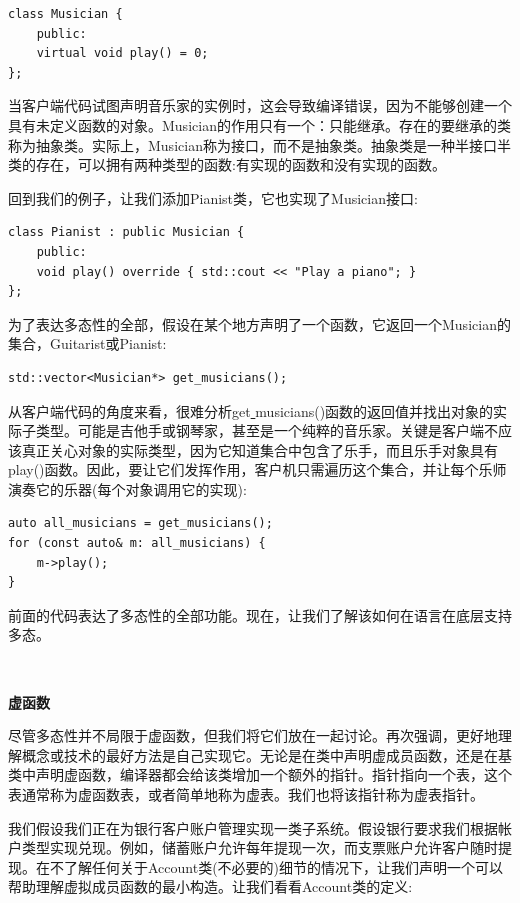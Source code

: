 \begin{lstlisting}[caption={}]
class Musician {
	public:
	virtual void play() = 0;
};
\end{lstlisting}

当客户端代码试图声明音乐家的实例时，这会导致编译错误，因为不能够创建一个具有未定义函数的对象。Musician的作用只有一个：只能继承。存在的要继承的类称为抽象类。实际上，Musician称为接口，而不是抽象类。抽象类是一种半接口半类的存在，可以拥有两种类型的函数:有实现的函数和没有实现的函数。\par
回到我们的例子，让我们添加Pianist类，它也实现了Musician接口:\par

\begin{lstlisting}[caption={}]
class Pianist : public Musician {
	public:
	void play() override { std::cout << "Play a piano"; }
};
\end{lstlisting}

为了表达多态性的全部，假设在某个地方声明了一个函数，它返回一个Musician的集合，Guitarist或Pianist: \par

\begin{lstlisting}[caption={}]
std::vector<Musician*> get_musicians();
\end{lstlisting}

从客户端代码的角度来看，很难分析get\underline{ }musicians()函数的返回值并找出对象的实际子类型。可能是吉他手或钢琴家，甚至是一个纯粹的音乐家。关键是客户端不应该真正关心对象的实际类型，因为它知道集合中包含了乐手，而且乐手对象具有play()函数。因此，要让它们发挥作用，客户机只需遍历这个集合，并让每个乐师演奏它的乐器(每个对象调用它的实现):\par

\begin{lstlisting}[caption={}]
auto all_musicians = get_musicians();
for (const auto& m: all_musicians) {
	m->play();
}
\end{lstlisting}

前面的代码表达了多态性的全部功能。现在，让我们了解该如何在语言在底层支持多态。 \par

\noindent\textbf{}\ \par
\textbf{虚函数} \ \par
尽管多态性并不局限于虚函数，但我们将它们放在一起讨论。再次强调，更好地理解概念或技术的最好方法是自己实现它。无论是在类中声明虚成员函数，还是在基类中声明虚函数，编译器都会给该类增加一个额外的指针。指针指向一个表，这个表通常称为虚函数表，或者简单地称为虚表。我们也将该指针称为虚表指针。 \par
我们假设我们正在为银行客户账户管理实现一类子系统。假设银行要求我们根据帐户类型实现兑现。例如，储蓄账户允许每年提现一次，而支票账户允许客户随时提现。在不了解任何关于Account类(不必要的)细节的情况下，让我们声明一个可以帮助理解虚拟成员函数的最小构造。让我们看看Account类的定义: \par

